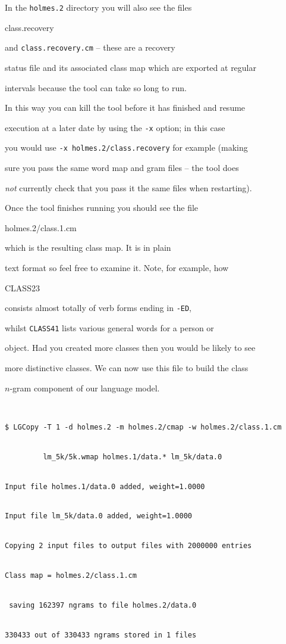 In the {\tt holmes.2} directory you will also see the files {\tt


class.recovery} and {\tt class.recovery.cm} -- these are a recovery


status file and its associated class map which are exported at regular


intervals because the  tool can take so long to run.


In this way you can kill the tool before it has finished and resume


execution at a later date by using the {\tt -x} option; in this case


you would use {\tt -x holmes.2/class.recovery} for example (making


sure you pass the same word map and gram files -- the tool does


{\it not} currently check that you pass it the same files when restarting).





Once the tool finishes running you should see the file {\tt


holmes.2/class.1.cm} which is the resulting class map.  It is in plain


text format so feel free to examine it.  Note, for example, how {\tt


CLASS23} consists almost totally of verb forms ending in {\tt -ED},


whilst {\tt CLASS41} lists various general words for a person or


object.  Had you created more classes then you would be likely to see


more distinctive classes.  We can now use this file to build the class


$n$-gram component of our language model.


\begin{verbatim}


$ LGCopy -T 1 -d holmes.2 -m holmes.2/cmap -w holmes.2/class.1.cm


         lm_5k/5k.wmap holmes.1/data.* lm_5k/data.0


Input file holmes.1/data.0 added, weight=1.0000


Input file lm_5k/data.0 added, weight=1.0000


Copying 2 input files to output files with 2000000 entries


Class map = holmes.2/class.1.cm


 saving 162397 ngrams to file holmes.2/data.0 


330433 out of 330433 ngrams stored in 1 files


\end{verbatim} %





